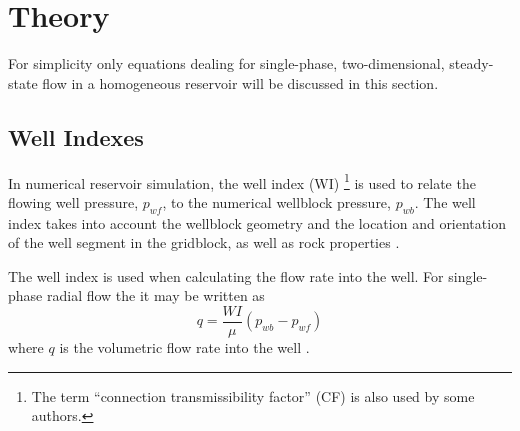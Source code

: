 
\section{Theory} %
\label{sec:theory}
For simplicity only equations dealing for single-phase, two-dimensional, steady-state flow in a homogeneous reservoir will be discussed in this section.

\subsection{Well Indexes} %
\label{sub:well_indices}
In numerical reservoir simulation, the well index (WI) \footnote{The term ``connection transmissibility factor'' (CF) is also used by some authors\cite{Peaceman2003New,Schlumberger2013Eclipse}.} is used to relate the flowing well pressure, $p_{wf}$,  to the numerical wellblock pressure, $p_{wb}$. The well index takes into account the wellblock geometry and the location and orientation of the well segment in the gridblock, as well as rock properties \cite{Peaceman2003New}.

The well index is used when calculating the flow rate into the well. For single-phase radial flow the it may be written as
\begin{equation}
    \label{eq:peaceman-wi1}
    q = \frac{WI}{\mu} \left( p_{wb} - p_{wf} \right)
\end{equation}
where $q$ is the volumetric flow rate into the well \cite{Peaceman2003New}.

